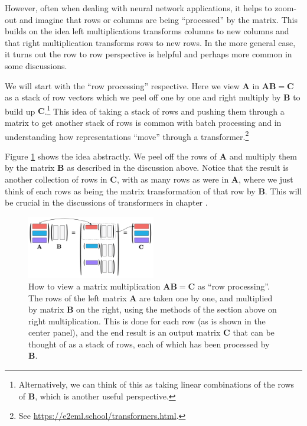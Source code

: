 However, often when dealing with neural network applications, it helps to zoom-out and imagine that rows or columns are being ``processed'' by the matrix. This builds on the idea left multiplications transforms columns to new columns and that right multiplication transforms rows to new rows. In the more general case, it turns out the row to row perspective is helpful and perhaps more common in some discussions. 

We will start with the ``row processing'' respective. Here we view $\mathbf{A}$ in  $\mathbf{A}\mathbf{B} = \mathbf{C}$ as a stack of row vectors which we peel off one by one and right multiply by $\mathbf{B}$ to build up $\mathbf{C}$.\footnote{Alternatively, we can think of this as taking linear combinations of the rows of $\mathbf{B}$, which is another useful perspective.} This idea of taking a stack of rows and pushing them through a matrix to get another stack of rows is common with batch processing and in understanding how representations ``move'' through a transformer.\footnote{See \url{ https://e2eml.school/transformers.html}.}

Figure \ref{rowPerspective} shows the idea abstractly. We peel off the rows of $\mathbf{A}$ and multiply them by the matrix $\mathbf{B}$ as described in the discussion above. Notice that the result is another collection of rows in $\mathbf{C}$, with as many rows as were in $\mathbf{A}$, where we just think of each rows as being the matrix transformation of that row by $\mathbf{B}$. This will be crucial in the discussions of transformers in chapter . 

\begin{figure}[h]
\centering
\includegraphics[width=0.5\textwidth]{images/rowPerspective.png}
\caption[Jeff Yoshimi.]{How to view a matrix multiplication  $\mathbf{A}\mathbf{B} = \mathbf{C}$ as ``row processing''.  The rows of the left matrix $\mathbf{A}$ are taken one by one, and multiplied by matrix $\mathbf{B}$  on the right, using the methods of the section above on right multiplication.  This is done for each row (as is shown in the center panel), and the end result is an output matrix $\mathbf{C}$ that can be thought of as a stack of rows, each of which has been processed by $\mathbf{B}$.}
\label{rowPerspective}
\end{figure} 

